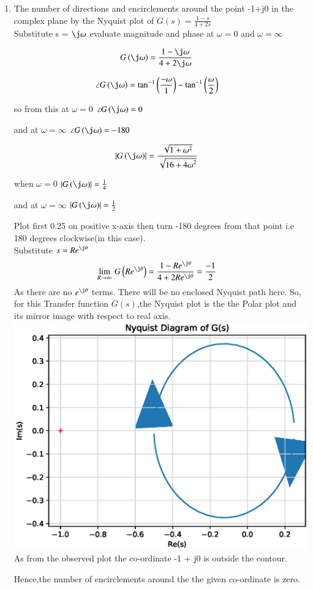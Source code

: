 \begin{enumerate}[label=\thesection.\arabic*.,ref=\thesection.\theenumi]
\item The number of directions and encirclements around the point -1+j0 in the complex plane by the Nyquist plot of $G(s) = \frac{1-s}{4+2s}$\\

\solution
Substitute s = $\j\omega$ evaluate magnitude and phase at $\omega = 0$ and $\omega = \infty$

\begin{align}
G\brak{\j\omega} &= \frac{1-\j\omega}{4+2\j\omega} 
\end{align}


\begin{align}
\angle G\brak{\j\omega} &= \tan^{-1}\brak{\frac{-\omega}{1}} - \tan^{-1}\brak{\frac{\omega}{2}}
\end{align}

so from this  at $\omega = 0$ $\angle G\brak{\j\omega} = 0$ 

and at $\omega = \infty$ $\angle G\brak{\j\omega}  =-180$  

\begin{align}
\abs{G\brak{\j\omega}} &= \frac{\sqrt{1+{\omega}^2}}{\sqrt{16+{4\omega}^2}} 
\end{align}

when $\omega = 0$ $\abs{G\brak{\j\omega}} = \frac{1}{4}$ 

and at  $\omega = \infty$ $\abs{G\brak{\j\omega}} = \frac{1}{2}$

Plot first 0.25 on positive x-axis then turn {-180} degrees from that point i.e {180} degrees clockwise(in this case).\\
Substitute $s = Re^{\j\theta}$
\begin{align}
\lim_{R\to \infty}\,G\brak{Re^{\j\theta}} &= \frac{1-Re^{\j\theta}}{4+2Re^{\j\theta}}=\frac{-1}{2}  
\end{align}
As there are no $e^{\j\theta}$ terms.
There will be no enclosed Nyquist path here.
So, for this Transfer function $G(s)$,the Nyquist plot is the the Polar plot and its mirror image with respect to real axis.
\includegraphics[width=\columnwidth]{./figs/ee18btech11034.eps}
As from the observed plot the co-ordinate -1 + j0 is outside the contour.

Hence,the number of encirclements around the the given co-ordinate is zero.
\end{enumerate}
